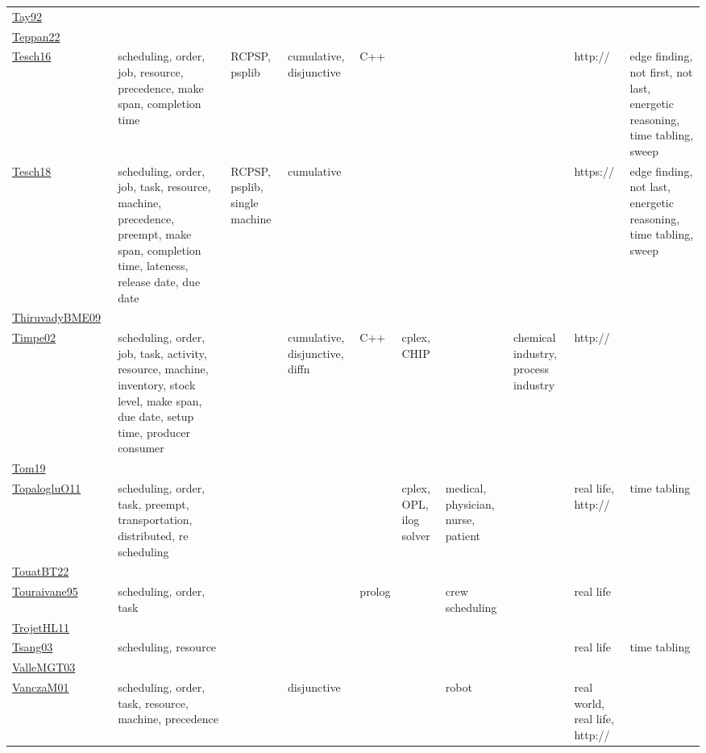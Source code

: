 {\begin{longtable}{p{3cm}p{4cm}p{2cm}p{2cm}p{2cm}p{2cm}p{2cm}p{2cm}p{2cm}p{2cm}}
\href{articles/Tay92.pdf}{Tay92}~\cite{Tay92} &  &  &  &  &  &  &  &  & \\
\href{papers/Teppan22.pdf}{Teppan22}~\cite{Teppan22} &  &  &  &  &  &  &  &  & \\
\href{papers/Tesch16.pdf}{Tesch16}~\cite{Tesch16} & scheduling, order, job, resource, precedence, make span, completion time & RCPSP, psplib & cumulative, disjunctive &  C++  &  &  &  & http:// & edge finding, not first, not last, energetic reasoning, time tabling, sweep\\
\href{papers/Tesch18.pdf}{Tesch18}~\cite{Tesch18} & scheduling, order, job, task, resource, machine, precedence, preempt, make span, completion time, lateness, release date, due date & RCPSP, psplib, single machine & cumulative &  &  &  &  & https:// & edge finding, not last, energetic reasoning, time tabling, sweep\\
\href{papers/ThiruvadyBME09.pdf}{ThiruvadyBME09}~\cite{ThiruvadyBME09} &  &  &  &  &  &  &  &  & \\
\href{articles/Timpe02.pdf}{Timpe02}~\cite{Timpe02} & scheduling, order, job, task, activity, resource, machine, inventory, stock level, make span, due date, setup time, producer consumer &  & cumulative, disjunctive, diffn &  C++  & cplex, CHIP &  & chemical industry, process industry & http:// & \\
\href{papers/Tom19.pdf}{Tom19}~\cite{Tom19} &  &  &  &  &  &  &  &  & \\
\href{articles/TopalogluO11.pdf}{TopalogluO11}~\cite{TopalogluO11} & scheduling, order, task, preempt, transportation, distributed, re scheduling &  &  &  & cplex, OPL, ilog solver & medical, physician, nurse, patient &  & real life, http:// & time tabling\\
\href{papers/TouatBT22.pdf}{TouatBT22}~\cite{TouatBT22} &  &  &  &  &  &  &  &  & \\
\href{papers/Touraivane95.pdf}{Touraivane95}~\cite{Touraivane95} & scheduling, order, task &  &  & prolog &  & crew scheduling &  & real life & \\
\href{articles/TrojetHL11.pdf}{TrojetHL11}~\cite{TrojetHL11} &  &  &  &  &  &  &  &  & \\
\href{articles/Tsang03.pdf}{Tsang03}~\cite{Tsang03} & scheduling, resource &  &  &  &  &  &  & real life & time tabling\\
\href{papers/ValleMGT03.pdf}{ValleMGT03}~\cite{ValleMGT03} &  &  &  &  &  &  &  &  & \\
\href{papers/VanczaM01.pdf}{VanczaM01}~\cite{VanczaM01} & scheduling, order, task, resource, machine, precedence &  & disjunctive &  &  & robot &  & real world, real life, http:// & \\

\end{longtable}}
